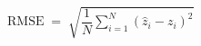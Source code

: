 \documentclass[border=14pt]{standalone}
\begin{document}
{\LARGE $\mathrm{RMSE} \;=\; \sqrt{\dfrac{1}{N}\sum_{i=1}^{N}\left(\hat{z}_i - z_i\right)^{2}}$}
\end{document}
